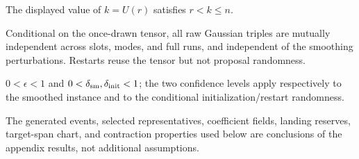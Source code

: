 \begin{assumption}\label{assump:subquadratic-rank}
The displayed value of $k=U(r)$ satisfies $r<k\le n$.
\end{assumption}

\begin{assumption}\label{assump:random-initialization}
Conditional on the once-drawn tensor, all raw Gaussian triples are mutually
independent across slots, modes, and full runs, and independent of the
smoothing perturbations. Restarts reuse the tensor but not proposal
randomness.
\end{assumption}

\begin{assumption}\label{assump:accuracy-confidence}
$0<\epsilon<1$ and $0<\delta_{\rm sm},\delta_{\rm init}<1$; the two
confidence levels apply respectively to the smoothed instance and to the
conditional initialization/restart randomness.
\end{assumption}

The generated events, selected representatives, coefficient fields, landing
reserves, target-span chart, and contraction properties used below are
conclusions of the appendix results, not additional assumptions.
